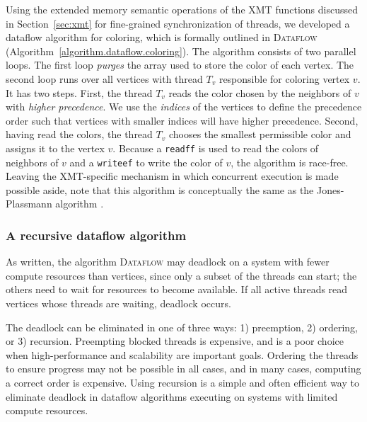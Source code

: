 \documentclass{article}
\begin{document}
Using the extended memory semantic operations of the XMT functions discussed in 
Section~\ref{sec:xmt} for fine-grained synchronization of threads, 
we developed a dataflow algorithm for coloring, which is formally 
outlined in \textsc{Dataflow} (Algorithm~\ref{algorithm.dataflow.coloring}).
The algorithm consists of two parallel loops.
The first loop {\em purges} the array used to store the color of each vertex.
The second loop runs over all vertices with thread $T_v$ responsible for coloring vertex $v$.
It has two steps.
First, the thread $T_v$ reads the color chosen by the neighbors of $v$ with {\em higher precedence}.
We use the {\em indices} of the vertices to define the precedence
order such that vertices with smaller indices will have higher precedence.
Second, having read the colors, the thread $T_v$ chooses the smallest permissible color and 
assigns it to the vertex $v$.
Because a \texttt{readff} is used to read the colors of neighbors of $v$ and 
a \texttt{writeef} to write the color of $v$, the algorithm is race-free.
Leaving the XMT-specific mechanism in which concurrent execution
is made possible aside, note that this algorithm is conceptually the same as the 
Jones-Plassmann algorithm \cite{JP93-v2}.

\subsubsection{A recursive dataflow algorithm}

As written, the algorithm \textsc{Dataflow} may deadlock on a system with fewer compute resources
than vertices, since only a subset of the threads can start; the others need to wait for resources to
become available. If all active threads read vertices whose threads are waiting, deadlock occurs.

The deadlock can be eliminated in one of three ways: 1) preemption, 2) ordering, or 3) recursion.
Preempting blocked threads is expensive, and is a poor choice when 
high-performance and scalability are important goals.
Ordering the threads to ensure progress may not be possible in all cases, 
and in many cases, computing a correct order is expensive.
Using recursion is a simple and often efficient way to eliminate deadlock in dataflow algorithms 
executing on systems with limited compute resources.
\end{document}
